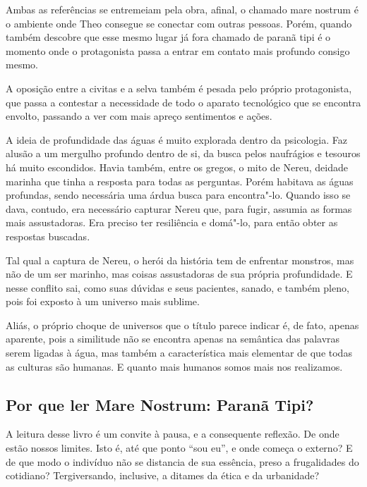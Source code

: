 \documentclass[12pt]{extarticle}
\begin{document}


Ambas as referências se entremeiam pela obra, afinal, o chamado mare
nostrum é o ambiente onde Theo consegue se conectar com outras pessoas.
Porém, quando também descobre que esse mesmo lugar já fora chamado de
paranã tipi é o momento onde o protagonista passa a entrar em contato
mais profundo consigo mesmo.

A oposição entre a civitas e a selva também é pesada pelo próprio
protagonista, que passa a contestar a necessidade de todo o aparato
tecnológico que se encontra envolto, passando a ver com mais apreço
sentimentos e ações.

A ideia de profundidade das águas é muito explorada dentro da
psicologia. Faz alusão a um mergulho profundo dentro de si, da busca
pelos naufrágios e tesouros há muito escondidos. Havia também, entre os
gregos, o mito de Nereu, deidade marinha que tinha a resposta para todas
as perguntas. Porém habitava as águas profundas, sendo necessária uma
árdua busca para encontra"-lo. Quando isso se dava, contudo, era
necessário capturar Nereu que, para fugir, assumia as formas mais
assustadoras. Era preciso ter resiliência e domá"-lo, para então obter as
respostas buscadas.

Tal qual a captura de Nereu, o herói da história tem de enfrentar
monstros, mas não de um ser marinho, mas coisas assustadoras de sua
própria profundidade. E nesse conflito sai, como suas dúvidas e seus
pacientes, sanado, e também pleno, pois foi exposto à um universo mais
sublime.

Aliás, o próprio choque de universos que o título parece indicar é, de
fato, apenas aparente, pois a similitude não se encontra apenas na
semântica das palavras serem ligadas à água, mas também a característica
mais elementar de que todas as culturas são humanas. E quanto mais
humanos somos mais nos realizamos.

\subsection{Por que ler Mare Nostrum: Paranã Tipi?}

A leitura desse livro é um convite à pausa, e a consequente reflexão. De
onde estão nossos limites. Isto é, até que ponto ``sou eu'', e onde
começa o externo? E de que modo o indivíduo não se distancia de sua
essência, preso a frugalidades do cotidiano? Tergiversando, inclusive, a
ditames da ética e da urbanidade?
\end{document}
